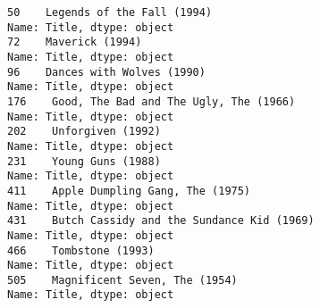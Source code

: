 \documentclass[11pt]{article}
\begin{document}
    \begin{Verbatim}[commandchars=\\\{\}]
50    Legends of the Fall (1994)
Name: Title, dtype: object
72    Maverick (1994)
Name: Title, dtype: object
96    Dances with Wolves (1990)
Name: Title, dtype: object
176    Good, The Bad and The Ugly, The (1966)
Name: Title, dtype: object
202    Unforgiven (1992)
Name: Title, dtype: object
231    Young Guns (1988)
Name: Title, dtype: object
411    Apple Dumpling Gang, The (1975)
Name: Title, dtype: object
431    Butch Cassidy and the Sundance Kid (1969)
Name: Title, dtype: object
466    Tombstone (1993)
Name: Title, dtype: object
505    Magnificent Seven, The (1954)
Name: Title, dtype: object

    \end{Verbatim}

    \begin{center}
    \end{center}
    { \hspace*{\fill} \\}
    
    \begin{center}
    \end{center}
    { \hspace*{\fill} \\}
    
\end{document}
